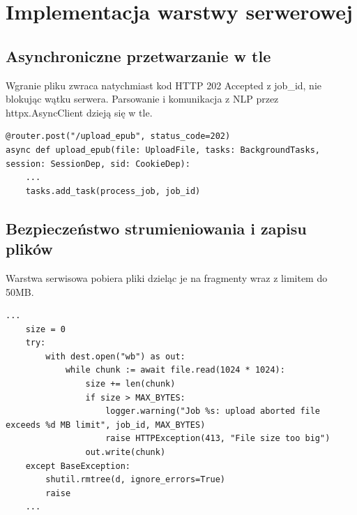 \section{Implementacja warstwy serwerowej}
\subsection{Asynchroniczne przetwarzanie w tle}
Wgranie pliku zwraca natychmiast kod HTTP 202 Accepted z job\_id, nie blokując wątku serwera. 
Parsowanie i komunikacja z NLP przez httpx.AsyncClient dzieją się w tle.
\begin{lstlisting}[style=pythonStyle, label={lst:bg_tasks}, caption={
    Sposób dodawania zadań do kolejki asynchronicznej.
}]
@router.post("/upload_epub", status_code=202)
async def upload_epub(file: UploadFile, tasks: BackgroundTasks, session: SessionDep, sid: CookieDep):
    ...
    tasks.add_task(process_job, job_id)
\end{lstlisting}

\subsection{Bezpieczeństwo strumieniowania i zapisu plików}
Warstwa serwisowa pobiera pliki dzieląc je na fragmenty wraz z limitem do 50MB.
\begin{lstlisting}[style=pythonStyle, label={lst:chunking}, caption={
    Sposób podziału na fragmenty i zabezpieczenie przez za dużymi plikami.
}]
    ...
    size = 0
    try:
        with dest.open("wb") as out:
            while chunk := await file.read(1024 * 1024):
                size += len(chunk)
                if size > MAX_BYTES:
                    logger.warning("Job %s: upload aborted file exceeds %d MB limit", job_id, MAX_BYTES)
                    raise HTTPException(413, "File size too big")
                out.write(chunk)
    except BaseException:
        shutil.rmtree(d, ignore_errors=True)
        raise
    ...
\end{lstlisting}

